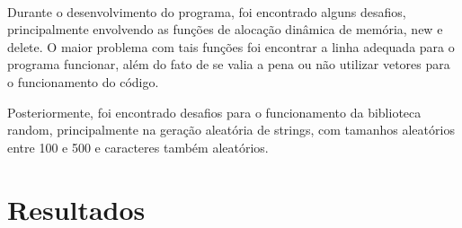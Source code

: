 \documentclass{article}
\begin{document}
\paragraph{} Durante o desenvolvimento do programa, foi encontrado alguns desafios, principalmente envolvendo as funções de alocação dinâmica de memória, new e delete. O maior problema com tais funções foi encontrar a linha adequada para o programa funcionar, além do fato de se valia a pena ou não utilizar vetores para o funcionamento do código. \par
Posteriormente, foi encontrado desafios para o funcionamento da biblioteca random, principalmente na geração aleatória de strings, com tamanhos aleatórios entre 100 e 500 e caracteres também aleatórios.

\section{Resultados}
\end{document}
